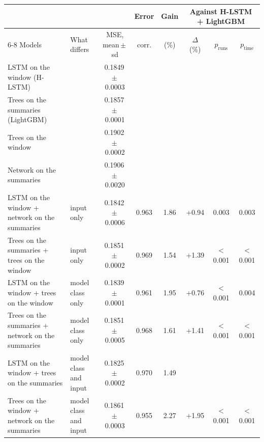 \begin{tabular}{@{}llcccccc@{}}
\toprule
 & & & Error & Gain & \multicolumn{3}{c}{Against H-LSTM + LightGBM} \\
\cmidrule(l){6-8}
Models & What differs & MSE, mean\,$\pm$\,sd & corr. & (\%) & $\Delta$ (\%) & $p_{\mathrm{runs}}$ & $p_{\mathrm{time}}$ \\
\midrule
LSTM on the window (H-LSTM) &  & 0.1849\,$\pm$\,0.0003 &  &  &  &  &  \\
Trees on the summaries (LightGBM) &  & 0.1857\,$\pm$\,0.0001 &  &  &  &  &  \\
Trees on the window &  & 0.1902\,$\pm$\,0.0002 &  &  &  &  &  \\
Network on the summaries &  & 0.1906\,$\pm$\,0.0020 &  &  &  &  &  \\
\addlinespace[2pt]
LSTM on the window + network on the summaries & input only & 0.1842\,$\pm$\,0.0006 & 0.963 & 1.86 & +0.94 & 0.003 & 0.003 \\
Trees on the summaries + trees on the window & input only & 0.1851\,$\pm$\,0.0002 & 0.969 & 1.54 & +1.39 & $<$0.001 & $<$0.001 \\
LSTM on the window + trees on the window & model class only & 0.1839\,$\pm$\,0.0001 & 0.961 & 1.95 & +0.76 & $<$0.001 & 0.004 \\
Trees on the summaries + network on the summaries & model class only & 0.1851\,$\pm$\,0.0005 & 0.968 & 1.61 & +1.41 & $<$0.001 & $<$0.001 \\
LSTM on the window + trees on the summaries & model class and input & 0.1825\,$\pm$\,0.0002 & 0.970 & 1.49 &  &  &  \\
Trees on the window + network on the summaries & model class and input & 0.1861\,$\pm$\,0.0003 & 0.955 & 2.27 & +1.95 & $<$0.001 & $<$0.001 \\
\bottomrule
\end{tabular}
